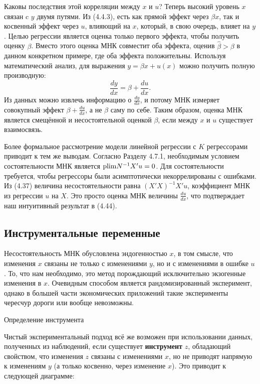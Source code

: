 Каковы последствия этой корреляции между  $x$ и $u$? Теперь высокий уровень $x$ связан c $y$ двумя путями. Из (4.4.3), есть как прямой эффект через $\beta x$, так и косвенный эффект через $u$, влияющий на $x$, который, в свою очередь, влияет на $y$. Целью регрессии является оценка только первого эффекта, чтобы получить оценку $\beta$. Вместо этого оценка МНК совместит оба эффекта, оценив $\hat{\beta}>\beta$ в данном конкретном примере, где оба эффекта положительны. Используя математический анализ, для выражения $y = \beta x +u(x)$ можно получить полную производную:
\begin{equation}
\frac{dy}{dx} = \beta + \frac{du}{dx}.
\end{equation}
Из данных можно извлечь информацию о $\frac{dy}{dx}$, и потому МНК измеряет совокупный эффект $\beta + \frac{du}{dx}$, а не $\beta$ саму по себе. Таким образом, оценка МНК является смещённой и несостоятельной оценкой $\beta$, если между $x$ и $u$ существует взаимосвязь.

Более формальное рассмотрение модели линейной регрессии с $K$ регрессорами приводит к тем же выводам. Согласно Разделу 4.7.1, необходимым условием состоятельности МНК является $\mathrm{plim } N^{-1}X'u=0$. Для состоятельности требуется, чтобы регрессоры были асимптотически некоррелированы с ошибками. Из (4.37) величина несостоятельности равна $(X'X)^{-1}X'u$, коэффициент МНК из регрессии $u$ на $X$. Это просто оценка МНК величины $\frac{du}{dx}$, что подтверждает наш интуитивный результат в (4.44).

\subsection{Инструментальные переменные}

Несостоятельность МНК обусловлена эндогенностью $x$, в том смысле, что изменения $x$ связаны не только с изменениями $y$, но и с изменениями в ошибке $u$. То, что нам необходимо, это метод порождающий исключительно экзогенные изменения в $x$. Очевидным способом является рандомизированный эксперимент, однако в большей части экономических приложений такие эксперименты чересчур дороги или вообще невозможны.
\begin{center}
Определение инструмента
\end{center}
Чистый экспериментальный подход всё же возможен при использовании данных, полученных из наблюдений, если существует \textbf{инструмент} $z$, обладающий свойством, что изменения $z$ связаны с изменениями $x$, но не приводят напрямую к изменениям $y$ (а только косвенно, через изменение $x$). Это приводит к следующей диаграмме:


